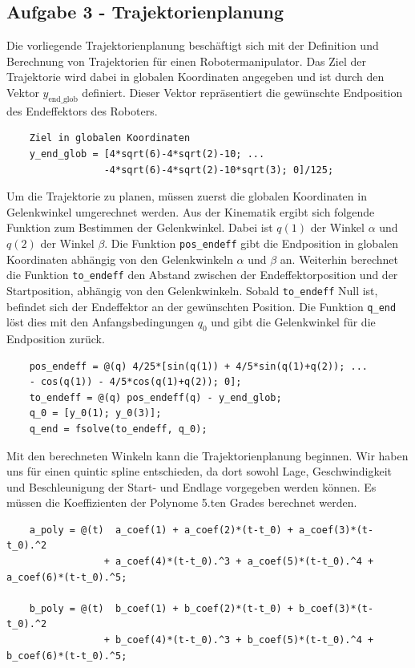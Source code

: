 \subsection*{Aufgabe 3 - Trajektorienplanung}


Die vorliegende Trajektorienplanung beschäftigt sich mit der Definition und Berechnung von Trajektorien für einen Robotermanipulator. Das Ziel der Trajektorie wird dabei in globalen Koordinaten angegeben und ist durch den Vektor \( y_{\text{end\_glob}} \) definiert. Dieser Vektor repräsentiert die gewünschte Endposition des Endeffektors des Roboters.

\begin{verbatim}
    Ziel in globalen Koordinaten
    y_end_glob = [4*sqrt(6)-4*sqrt(2)-10; ...
                 -4*sqrt(6)-4*sqrt(2)-10*sqrt(3); 0]/125;
\end{verbatim}

Um die Trajektorie zu planen, müssen zuerst die globalen Koordinaten in Gelenkwinkel umgerechnet werden. Aus der Kinematik ergibt sich folgende Funktion zum Bestimmen der Gelenkwinkel. Dabei ist \(q(1)\) der Winkel \(\alpha\) und \(q(2)\) der Winkel \(\beta\). Die Funktion \texttt{pos\_endeff} gibt die Endposition in globalen Koordinaten abhängig von den Gelenkwinkeln \(\alpha\) und \(\beta\) an.  Weiterhin berechnet die Funktion \texttt{to\_endeff} den Abstand zwischen der Endeffektorposition und der Startposition, abhängig von den Gelenkwinkeln. Sobald \texttt{to\_endeff} Null ist, befindet sich der Endeffektor an der gewünschten Position. Die Funktion \texttt{q\_end} löst dies mit den Anfangsbedingungen \(q_0\) und gibt die Gelenkwinkel für die Endposition zurück.

\begin{verbatim}
    pos_endeff = @(q) 4/25*[sin(q(1)) + 4/5*sin(q(1)+q(2)); ...
    - cos(q(1)) - 4/5*cos(q(1)+q(2)); 0];
    to_endeff = @(q) pos_endeff(q) - y_end_glob;
    q_0 = [y_0(1); y_0(3)];
    q_end = fsolve(to_endeff, q_0);
\end{verbatim}

Mit den berechneten Winkeln kann die Trajektorienplanung beginnen. Wir haben uns für einen quintic spline entschieden, da dort sowohl Lage, Geschwindigkeit und Beschleunigung der Start- und Endlage vorgegeben werden können.
 Es müssen die Koeffizienten der Polynome 5.ten Grades berechnet werden.

 \begin{verbatim}
    a_poly = @(t)  a_coef(1) + a_coef(2)*(t-t_0) + a_coef(3)*(t-t_0).^2 
                 + a_coef(4)*(t-t_0).^3 + a_coef(5)*(t-t_0).^4 + a_coef(6)*(t-t_0).^5;
   
    b_poly = @(t)  b_coef(1) + b_coef(2)*(t-t_0) + b_coef(3)*(t-t_0).^2
                 + b_coef(4)*(t-t_0).^3 + b_coef(5)*(t-t_0).^4 + b_coef(6)*(t-t_0).^5;
\end{verbatim}

